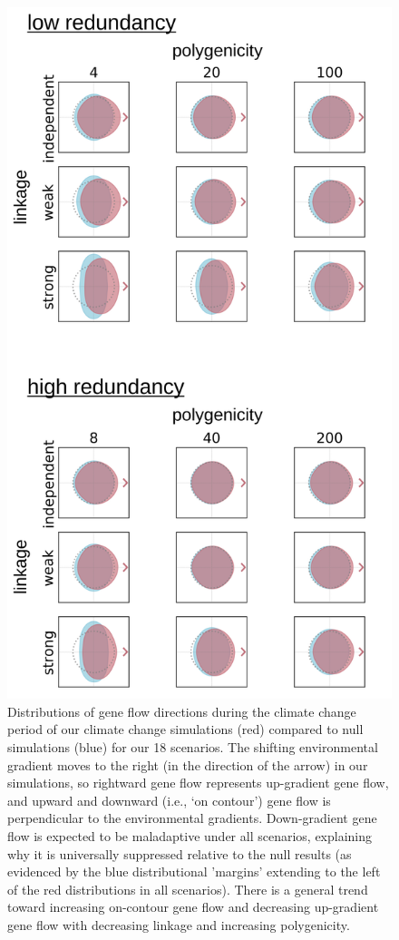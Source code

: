 \documentclass[9pt,twocolumn,twoside,lineno]{new_article}
\begin{document}
\begin{figure}
\centering
\includegraphics[width=.8\linewidth]{pub/figs_and_stats/FIG_2_gene_flow.jpg}
    \caption{Distributions of gene flow directions during the climate change period of our climate change simulations (red) compared to null simulations (blue) for our 18 scenarios.  The shifting environmental gradient moves to the right (in the direction of the arrow) in our simulations, so rightward gene flow represents up-gradient gene flow, and upward and downward (i.e., `on contour’) gene flow is perpendicular to the environmental gradients. Down-gradient gene flow is expected to be maladaptive under all scenarios, explaining why it is universally suppressed relative to the null results (as evidenced by the blue distributional 'margins' extending to the left of the red distributions in all scenarios). There is a general trend toward increasing on-contour gene flow and decreasing up-gradient gene flow with decreasing linkage and increasing polygenicity.
}
\label{fig:fig_2}
\end{figure}
\end{document}
